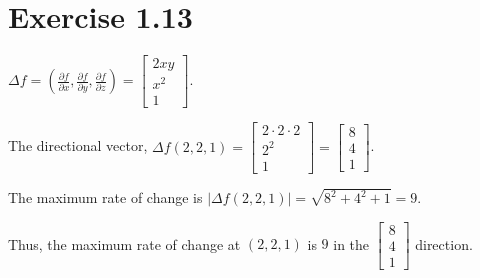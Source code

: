 \documentclass[11pt,fleqn]{book} %
\begin{document}
\section*{Exercise 1.13}

$\Delta f = \left( \frac{\partial f}{\partial x}, \frac{\partial f}{\partial y}, \frac{\partial f}{\partial z} \right) = \begin{bmatrix} 2xy \\ x^2 \\ 1 \end{bmatrix}$. 

The directional vector, $\Delta f(2, 2, 1) = \begin{bmatrix} 2 \cdot 2 \cdot 2 \\ 2^2 \\ 1 \end{bmatrix} = \begin{bmatrix} 8 \\ 4 \\ 1 \end{bmatrix}$. 

The maximum rate of change is $| \Delta f(2, 2, 1) | = \sqrt{8^2 + 4^2 + 1} = 9$. 

Thus, the maximum rate of change at $(2, 2, 1)$ is $9$ in the $\begin{bmatrix} 8 \\ 4 \\ 1 \end{bmatrix}$ direction. 


\cleardoublepage
{}
\setlength{\columnsep}{0.75cm}
\printindex

\end{document}
